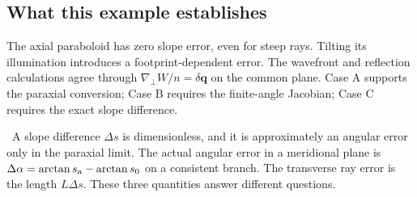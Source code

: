 \documentclass[11pt,a4paper]{article}
\numberwithin{equation}{section}
\newcommand{\gradp}{\nabla_{\!\perp}}
\newcommand{\vct}[1]{\bm{#1}}
\newcommand{\caution}[1]{\par\smallskip\noindent{\color{warm}\textbf{Keep distinct.}}\ #1\par\smallskip}
\begin{document}
\subsection{What this example establishes}
The axial paraboloid has zero slope error, even for steep rays.
Tilting its illumination introduces a footprint-dependent error.
The wavefront and reflection calculations agree through
$\gradp W/n=\delta\vct q$ on the common plane.
Case A supports the paraxial conversion; Case B requires the finite-angle
Jacobian; Case C requires the exact slope difference.

\caution{A slope difference $\Delta s$ is dimensionless, and it is
approximately an angular error only in the paraxial limit.
The actual angular error in a meridional plane is
$\Delta\alpha=\arctan s_{\rm a}-\arctan s_0$ on a consistent branch.
The transverse ray error is the length $L\Delta s$.
These three quantities answer different questions.}
\end{document}
